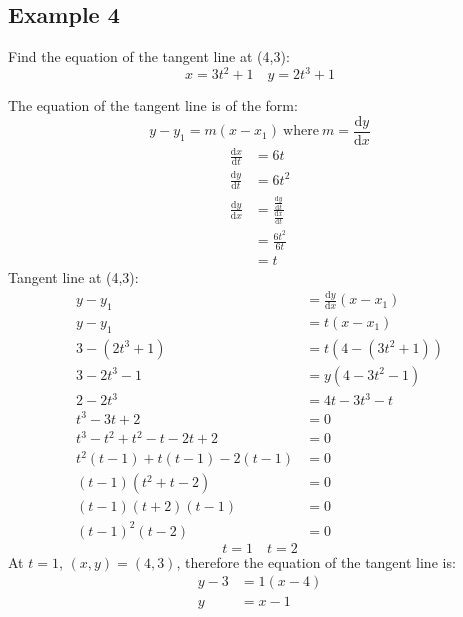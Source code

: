 \documentclass[letterpaper, 12pt]{article}
\newcommand*{\diff}{\mathrm{d}}
\begin{document}
\subsection*{Example 4}
Find the equation of the tangent line at (4,3):
\[ x = 3t^{2}+1 \quad y = 2t^{3}+1 \]
\begin{center}
\end{center}
The equation of the tangent line is of the form:
\[ y-y_{1}=m(x-x_{1}) \mathrm{\ where\ } m = \frac{\diff{y}}{\diff{x}} \]
\begin{align*}
  \frac{\diff{x}}{\diff{t}} &= 6t \\
  \frac{\diff{y}}{\diff{t}} &= 6t^{2} \\
  \frac{\diff{y}}{\diff{x}} &=
    \frac{\frac{\diff{y}}{\diff{t}}}{\frac{\diff{x}}{\diff{t}}} \\
  &= \frac{6t^{2}}{6t} \\
  &= t
\end{align*}
Tangent line at (4,3):
\begin{align*}
  y-y_{1} &= \frac{\diff{y}}{\diff{x}}(x-x_{1}) \\
  y-y_{1} &= t(x-x_{1}) \\
  3-(2t^{3}+1) &= t(4-(3t^{2}+1)) \\
  3-2t^{3}-1 &= y(4-3t^{2}-1) \\
  2-2t^{3} &= 4t-3t^{3}-t \\
  t^{3}-3t+2 &= 0 \\
  t^{3}-t^{2}+t^{2}-t-2t+2 &= 0 \\
  t^{2}(t-1)+t(t-1)-2(t-1) &= 0 \\
  (t-1)(t^{2}+t-2) &= 0 \\
  (t-1)(t+2)(t-1) &= 0 \\
  (t-1)^{2}(t-2) &= 0
\end{align*}
\[ t = 1 \quad t = 2 \]
At \( t = 1 \), \( (x, y) = (4,3) \), therefore the equation of the tangent
line is:
\begin{align*}
  y-3 &= 1(x-4) \\
  y &= x - 1
\end{align*}
\end{document}
